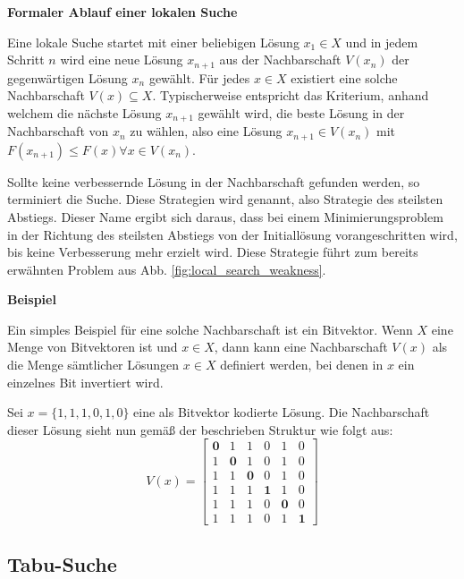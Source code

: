 \textbf{Formaler Ablauf einer lokalen Suche}

Eine lokale Suche startet mit einer beliebigen Lösung $x_1 \in X$ und in jedem Schritt $n$
wird eine neue Lösung $x_{n+1}$ aus der Nachbarschaft $V(x_n)$ der gegenwärtigen Lösung $x_n$ gewählt.
Für jedes $x \in X$ existiert eine solche Nachbarschaft $V(x) \subseteq X$.
Typischerweise entspricht das Kriterium, anhand welchem die nächste Lösung $x_{n+1}$ gewählt wird,
die beste Lösung in der Nachbarschaft von $x_n$ zu wählen, also eine Lösung $x_{n+1} \in V(x_n)$
mit $F(x_{n+1}) \leq F(x) \forall x \in V(x_n)$. \cite{Pirlot1996}

Sollte keine verbessernde Lösung in der Nachbarschaft gefunden werden, so terminiert die Suche.
Diese Strategien wird  genannt, also Strategie des steilsten Abstiegs.
Dieser Name ergibt sich daraus, dass bei einem Minimierungsproblem in der Richtung des steilsten Abstiegs
von der Initiallösung vorangeschritten wird, bis keine Verbesserung mehr erzielt wird. Diese Strategie führt zum
bereits erwähnten Problem aus Abb. \ref{fig:local_search_weakness}.

\textbf{Beispiel}

Ein simples Beispiel für eine solche Nachbarschaft ist ein Bitvektor. Wenn $X$ eine Menge
von Bitvektoren ist und $x \in X$, dann kann eine Nachbarschaft $V(x)$ als die Menge
sämtlicher Lösungen $x \in X$ definiert werden, bei denen in $x$ ein einzelnes Bit invertiert wird. \cite{Pirlot1996}

Sei $x = \{1, 1, 1, 0, 1, 0\}$ eine als Bitvektor kodierte Lösung.
Die Nachbarschaft dieser Lösung sieht nun gemäß der beschrieben Struktur wie folgt aus:
\[
V(x) =
  \begin{bmatrix}
    \boldsymbol{0} & 1 & 1 & 0 & 1 & 0 \\
    1 & \boldsymbol{0} & 1 & 0 & 1 & 0 \\
    1 & 1 & \boldsymbol{0} & 0 & 1 & 0 \\
    1 & 1 & 1 & \boldsymbol{1} & 1 & 0 \\
    1 & 1 & 1 & 0 & \boldsymbol{0} & 0 \\
    1 & 1 & 1 & 0 & 1 & \boldsymbol{1}
  \end{bmatrix}
\]

\pagebreak

\subsection{Tabu-Suche}
\label{sec:tabu_seach}


